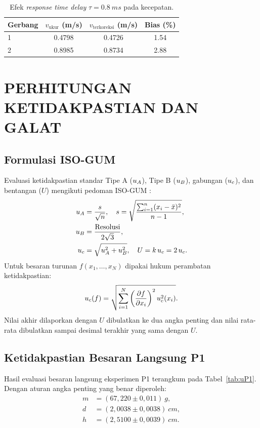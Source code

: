 \documentclass[a4paper, 12pt]{article}
\begin{document}
\begin{table}[H]
\centering
\singlespacing
\caption{Efek \textit{response time delay} $\tau=\SI{0,8}{ms}$ pada kecepatan.}
\label{tab:delay}
\small
\begin{tabular}{l S[table-format=1.4] S[table-format=1.4] S[table-format=1.2]}
\toprule
\textbf{Gerbang} & {$v_{\mathrm{ukur}}$ (m/s)} & {$v_{\mathrm{terkoreksi}}$ (m/s)} & {Bias (\%)}\\
 & 0.4798 & 0.4726 & 1.54\\
2 & 0.8985 & 0.8734 & 2.88\\
\bottomrule
\end{tabular}
\end{table}

\section{PERHITUNGAN KETIDAKPASTIAN DAN GALAT}
        \subsection{Formulasi ISO-GUM}
        Evaluasi ketidakpastian standar Tipe A ($u_{A}$), Tipe B ($u_{B}$), gabungan ($u_{c}$), dan bentangan ($U$) mengikuti pedoman ISO-GUM \parencite{JCGM2008GUM}:
        \begin{align}
            u_{A} &= \frac{s}{\sqrt{n}},\quad s=\sqrt{\frac{\sum_{i=1}^{n}(x_i-\bar{x})^2}{n-1}},\label{eq:uA}\\
            u_{B} &= \frac{\text{Resolusi}}{2\sqrt{3}},\label{eq:uB}\\
            u_{c} &= \sqrt{u_{A}^{2}+u_{B}^{2}},\quad U=k\,u_{c}=2\,u_{c}.\label{eq:U}
        \end{align}
        Untuk besaran turunan $f(x_1,\dots,x_N)$ dipakai hukum perambatan ketidakpastian:
        \begin{equation}
            u_{c}(f)=\sqrt{\sum_{i=1}^{N}\left(\frac{\partial f}{\partial x_i}\right)^{2}u_{c}^{2}(x_i)}.
            \label{eq:prop}
        \end{equation}
        Nilai akhir dilaporkan dengan $U$ dibulatkan ke dua angka penting dan nilai rata-rata dibulatkan sampai desimal terakhir yang sama dengan $U$.

        \subsection{Ketidakpastian Besaran Langsung P1}
        Hasil evaluasi besaran langsung eksperimen P1 terangkum pada Tabel~\ref{tab:uP1}. Dengan aturan angka penting yang benar diperoleh:
        \begin{align*}
            m &= (67{,}220\pm0{,}011)\ \si{g},\\
            d &= (2{,}0038\pm0{,}0038)\ \si{cm},\\
            h &= (2{,}5100\pm0{,}0039)\ \si{cm}.
        \end{align*}
\end{document}
